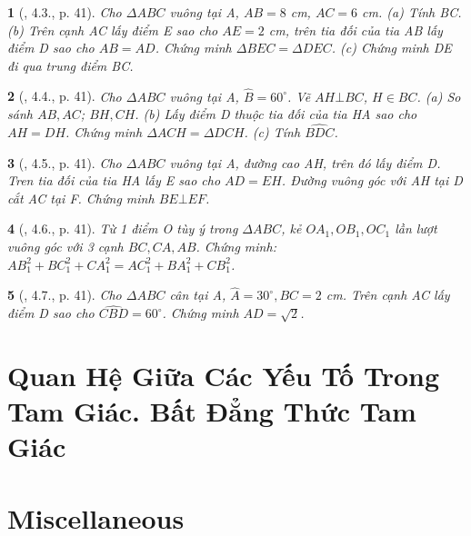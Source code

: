 \documentclass{article}
\newtheorem{baitoan}{}
\begin{document}
\begin{baitoan}[\cite{Hung_Mai_Toan_7_hinh_hoc}, 4.3., p. 41]
	Cho $\Delta ABC$ vuông tại A, $AB = 8$ {\rm cm}, $AC = 6$ {\rm cm}. (a) Tính BC. (b) Trên cạnh AC lấy điểm E sao cho $AE = 2$ {\rm cm}, trên tia đối của tia AB lấy điểm D sao cho $AB = AD$. Chứng minh $\Delta BEC = \Delta DEC$. (c) Chứng minh DE đi qua trung điểm BC.
\end{baitoan}

\begin{baitoan}[\cite{Hung_Mai_Toan_7_hinh_hoc}, 4.4., p. 41]
	Cho $\Delta ABC$ vuông tại A, $\widehat{B} = 60^\circ$. Vẽ $AH\bot BC$, $H\in BC$. (a) So sánh $AB,AC$; $BH,CH$. (b) Lấy điểm D thuộc tia đối của tia HA sao cho $AH = DH$. Chứng minh $\Delta ACH = \Delta DCH$. (c) Tính $\widehat{BDC}$.
\end{baitoan}

\begin{baitoan}[\cite{Hung_Mai_Toan_7_hinh_hoc}, 4.5., p. 41]
	Cho $\Delta ABC$ vuông tại A, đường cao AH, trên đó lấy điểm D. Tren tia đối của tia HA lấy E sao cho $AD = EH$. Đường vuông góc với AH tại D cắt AC tại F. Chứng minh $BE\bot EF$.
\end{baitoan}

\begin{baitoan}[\cite{Hung_Mai_Toan_7_hinh_hoc}, 4.6., p. 41]
	Từ 1 điểm O tùy ý trong $\Delta ABC$, kẻ $OA_1,OB_1,OC_1$ lần lượt vuông góc với 3 cạnh $BC,CA,AB$. Chứng minh: $AB_1^2 + BC_1^2 + CA_1^2 = AC_1^2 + BA_1^2 + CB_1^2$.
\end{baitoan}

\begin{baitoan}[\cite{Hung_Mai_Toan_7_hinh_hoc}, 4.7., p. 41]
	Cho $\Delta ABC$ cân tại A, $\widehat{A} = 30^\circ,BC = 2$ {\rm cm}. Trên cạnh AC lấy điểm D sao cho $\widehat{CBD} = 60^\circ$. Chứng minh $AD = \sqrt{2}$.
\end{baitoan}


\section{Quan Hệ Giữa Các Yếu Tố Trong Tam Giác. Bất Đẳng Thức Tam Giác}


\section{Miscellaneous}


\printbibliography[heading=bibintoc]
	
\end{document}

